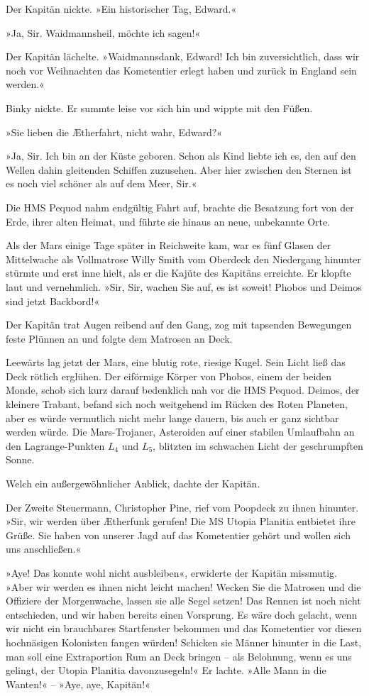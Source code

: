 Der Kapitän nickte. »Ein historischer Tag, Edward.«

»Ja, Sir. Waidmannsheil, möchte ich sagen!«

Der Kapitän lächelte. »Waidmannsdank, Edward! Ich bin
zuversichtlich, dass wir noch vor Weihnachten das Kometentier
erlegt haben und zurück in England sein werden.«

Binky nickte. Er summte leise vor sich hin und wippte mit den
Füßen.

»Sie lieben die Ætherfahrt, nicht wahr, Edward?«

»Ja, Sir. Ich bin an der Küste geboren. Schon als Kind liebte ich
es, den auf den Wellen dahin gleitenden Schiffen zuzusehen. Aber
hier zwischen den Sternen ist es noch viel schöner als auf dem
Meer, Sir.«

Die HMS Pequod nahm endgültig Fahrt auf, brachte die Besatzung fort
von der Erde, ihrer alten Heimat, und führte sie hinaus an neue,
unbekannte Orte.

Als der Mars einige Tage später in Reichweite kam, war es fünf
Glasen der Mittelwache als Vollmatrose Willy Smith vom Oberdeck den
Niedergang hinunter stürmte und erst inne hielt, als er die Kajüte
des Kapitäns erreichte. Er klopfte laut und vernehmlich. »Sir, Sir,
wachen Sie auf, es ist soweit! Phobos und Deimos sind jetzt
Backbord!«

Der Kapitän trat Augen reibend auf den Gang, zog mit tapsenden
Bewegungen feste Plünnen an und folgte dem Matrosen an Deck.

Leewärts lag jetzt der Mars, eine blutig rote, riesige Kugel. Sein
Licht ließ das Deck rötlich erglühen. Der eiförmige Körper von
Phobos, einem der beiden Monde, schob sich kurz darauf bedenklich
nah vor die HMS Pequod. Deimos, der kleinere Trabant, befand sich
noch weitgehend im Rücken des Roten Planeten, aber es würde
vermutlich nicht mehr lange dauern, bis auch er ganz sichtbar
werden würde. Die Mars-Trojaner, Asteroiden auf einer stabilen
Umlaufbahn an den Lagrange-Punkten $L_{4}$ und
$L_5$, blitzten im schwachen Licht der geschrumpften
Sonne.

Welch ein außergewöhnlicher Anblick, dachte der Kapitän.

Der Zweite Steuermann, Christopher Pine, rief vom Poopdeck zu ihnen
hinunter. »Sir, wir werden über Ætherfunk gerufen! Die MS Utopia
Planitia entbietet ihre Grüße. Sie haben von unserer Jagd auf das
Kometentier gehört und wollen sich uns anschließen.«

»Aye! Das konnte wohl nicht ausbleiben«, erwiderte der Kapitän
missmutig. »Aber wir werden es ihnen nicht leicht machen! Wecken
Sie die Matrosen und die Offiziere der Morgenwache, lassen sie alle
Segel setzen! Das Rennen ist noch nicht entschieden, und wir haben
bereits einen Vorsprung. Es wäre doch gelacht, wenn wir nicht ein
brauchbares Startfenster bekommen und das Kometentier vor diesen
hochnäsigen Kolonisten fangen würden! Schicken sie Männer hinunter
in die Last, man soll eine Extraportion Rum an Deck bringen – als
Belohnung, wenn es uns gelingt, der Utopia Planitia davonzusegeln!«
Er lachte. »Alle Mann in die Wanten!« – »Aye, aye, Kapitän!«

